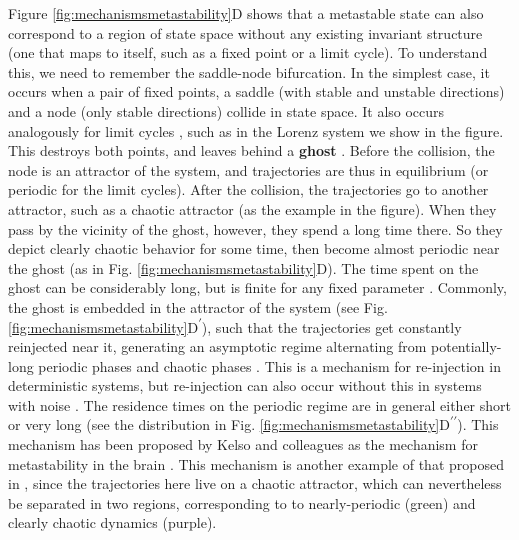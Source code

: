 \documentclass[reprint,onecolumn,superscriptaddress,showpacs,amsmath,amssymb,aps,floatfix]{revtex4-2}
\theoremstyle{definition}
\newcommand{\Emph}[1]{\textbf{#1}}
\newcommand*{\everymodeprime}{\ensuremath{\prime}}
\begin{document}
Figure \ref{fig:mechanismsmetastability}D shows that a metastable state can also correspond to a region of state space without any existing invariant structure (one that maps to itself, such as a fixed point or a limit cycle). To understand this, we need to remember the saddle-node bifurcation. In the simplest case, it occurs when a pair of fixed points, a saddle (with stable and unstable directions) and a node (only stable directions) collide in state space. It also occurs analogously for limit cycles \cite{medeiros2016trapping}, such as in the Lorenz system we show in the figure. This destroys both points, and leaves behind a \Emph{ghost} \cite{pomeau1979intermittency, pomeau1980intermittent, strogatz2002nonlinear}. Before the collision, the node is an attractor of the system, and trajectories are thus in equilibrium (or periodic for the limit cycles). After the collision, the trajectories go to another attractor, such as a chaotic attractor (as the example in the figure). When they pass by the vicinity of the ghost, however, they spend a long time there. So they depict clearly chaotic behavior for some time, then become almost periodic near the ghost (as in Fig. \ref{fig:mechanismsmetastability}D). The time spent on the ghost can be considerably long, but is finite for any fixed parameter \cite{pomeau1980intermittent}. Commonly, the ghost is embedded in the attractor of the system (see Fig. \ref{fig:mechanismsmetastability}D\textsuperscript{\everymodeprime}), such that the trajectories get constantly reinjected near it, generating an asymptotic regime alternating from potentially-long periodic phases and chaotic phases \cite{pomeau1980intermittent}. This is a mechanism for re-injection in deterministic systems, but re-injection can also occur without this in systems with noise \cite{medeiros2016trapping}. The residence times on the periodic regime are in general either short or very long (see the distribution in Fig. \ref{fig:mechanismsmetastability}D\textsuperscript{\everymodeprime\everymodeprime}). This mechanism has been proposed by Kelso and colleagues as the mechanism for metastability in the brain \cite{kelso1991an, tognoli2014metastable}. This mechanism is another example of that proposed in \cite{friston2000transients}, since the trajectories here live on a chaotic attractor, which can nevertheless be separated in two regions, corresponding to to nearly-periodic (green) and clearly chaotic dynamics (purple). 
\end{document}
